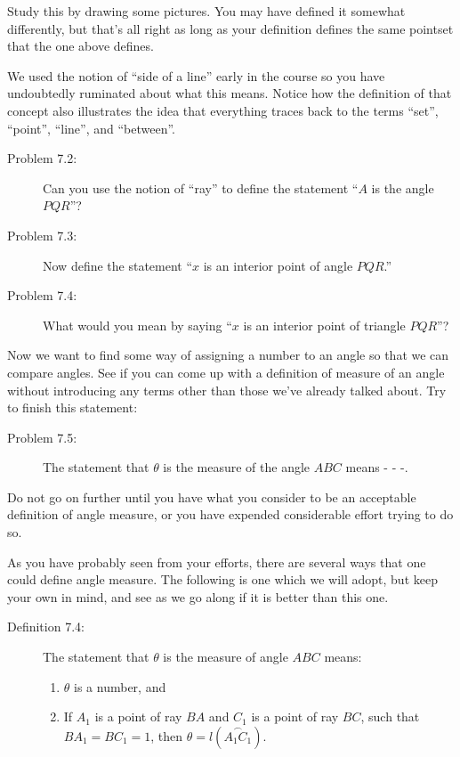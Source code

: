 \documentclass[english]{book}
\newcommand{\arc}[1]{\overset{\frown}{#1} }
\begin{document}
Study this by drawing some pictures. You may have defined it somewhat differently, but that's all right as long as your definition defines the same pointset that the one above defines.

We used the notion of ``side of a line'' early in the course so you have undoubtedly ruminated about what this means. Notice how the definition of that concept also illustrates the idea that everything traces back to the terms ``set'', ``point'', ``line'', and ``between''.

\begin{description}

\item[Problem 7.2:] Can you use the notion of ``ray'' to define the statement ``$A$ is the angle $PQR$''?

\item[Problem 7.3:] Now define the statement ``$x$ is an interior point of angle $PQR$.''

\item[Problem 7.4:] What would you mean by saying ``$x$ is an interior point of triangle $PQR$''? 

\end{description}

Now we want to find some way of assigning a number to an angle so that we can compare angles. See if you can come up with a definition of measure of an angle without introducing any terms other than those we've already talked about. Try to finish this statement:

\begin{description}

\item[Problem 7.5:] The statement that $\theta$ is the measure of the angle $ABC$ means - - -.

\end{description}

Do not go on further until you have what you consider to be an acceptable definition of angle measure, or you have expended considerable effort trying to do so.

As you have probably seen from your efforts, there are several ways that one could define angle measure. The following is one which we will adopt, but keep your own in mind, and see as we go along if it is better than this one.

\begin{description}

\item[Definition 7.4:] The statement that $\theta$ is the measure of angle $ABC$ means:
  \begin{enumerate}[\hspace{1cm}1)]
    \item $\theta$ is a number, and
    \item If $A_{1}$ is a point of ray $BA$ and $C_{1}$ is a point of ray $BC$, such that $BA_{1} = BC_{1} = 1$, then $\theta = l(\arc{A_{1}C_{1}})$.
  \end{enumerate}

\end{description}
\end{document}
